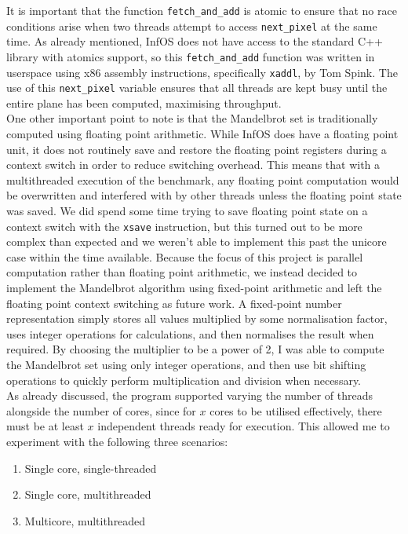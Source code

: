 \documentclass[bsc,frontabs,twoside,singlespacing,parskip,deptreport]{infthesis}     %
\begin{document}
It is important that the function \verb|fetch_and_add| is atomic to ensure that no race conditions arise when two threads attempt to access \verb|next_pixel| at the same time. As already mentioned, InfOS does not have access to the standard C++ library with atomics support, so this \verb|fetch_and_add| function was written in userspace using x86 assembly instructions, specifically \verb|xaddl|, by Tom Spink. The use of this \verb|next_pixel| variable ensures that all threads are kept busy until the entire plane has been computed, maximising throughput. \\

One other important point to note is that the Mandelbrot set is traditionally computed using floating point arithmetic. While InfOS does have a floating point unit, it does not routinely save and restore the floating point registers during a context switch in order to reduce switching overhead. This means that with a multithreaded execution of the benchmark, any floating point computation would be overwritten and interfered with by other threads unless the floating point state was saved. We did spend some time trying to save floating point state on a context switch with the \verb|xsave| instruction, but this turned out to be more complex than expected and we weren't able to implement this past the unicore case within the time available. Because the focus of this project is parallel computation rather than floating point arithmetic, we instead decided to implement the Mandelbrot algorithm using fixed-point arithmetic and left the floating point context switching as future work. A fixed-point number representation simply stores all values multiplied by some normalisation factor, uses integer operations for calculations, and then normalises the result when required. By choosing the multiplier to be a power of 2, I was able to compute the Mandelbrot set using only integer operations, and then use bit shifting operations to quickly perform multiplication and division when necessary. \\

As already discussed, the program supported varying the number of threads alongside the number of cores, since for $x$ cores to be utilised effectively, there must be at least $x$ independent threads ready for execution. This allowed me to experiment with the following three scenarios:

\begin{enumerate}
    \item Single core, single-threaded 
    \item Single core, multithreaded 
    \item Multicore, multithreaded
\end{enumerate}
\end{document}
